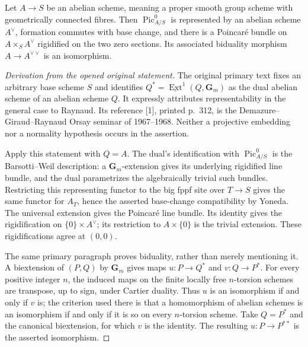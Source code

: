\begin{theorem}
\label{geo-Kb-dual}
Let $A\to S$ be an abelian scheme, meaning a proper smooth group scheme
with geometrically connected fibres. Then $\operatorname{Pic}^0_{A/S}$ is
represented by an abelian scheme $A^\vee$, formation commutes with base
change, and there is a Poincar\'e bundle on $A\times_S A^\vee$ rigidified
on the two zero sections. Its associated biduality morphism
$A\to A^{\vee\vee}$ is an isomorphism.
\end{theorem}
\begin{proof}[Derivation from the opened original statement]
The original primary text \cite[Expos\'e VIII, 3.2, pp.~254--255]{geoSGA7I}
fixes an arbitrary base scheme $S$ and identifies
$Q^*=\underline{\operatorname{Ext}}^1(Q,\mathbf G_m)$ as the dual abelian
scheme of an abelian scheme $Q$. It expressly attributes representability
in the general case to Raynaud. Its reference [1], printed p.~312, is the
Demazure--Giraud--Raynaud Orsay seminar of 1967--1968. Neither a projective
embedding nor a normality hypothesis occurs in the assertion.

Apply this statement with $Q=A$. The dual's identification with
$\operatorname{Pic}^0_{A/S}$ is the Barsotti--Weil description: a
$\mathbf G_m$-extension gives its underlying rigidified line bundle, and
the dual parametrizes the algebraically trivial such bundles. Restricting
this representing functor to the big fppf site over $T\to S$ gives the
same functor for $A_T$, hence the asserted base-change compatibility by
Yoneda. The universal extension gives the Poincar\'e line bundle. Its
identity gives the rigidification on $\{0\}\times A^\vee$; its restriction
to $A\times\{0\}$ is the trivial extension. These rigidifications agree
at $(0,0)$.

The same primary paragraph proves biduality, rather than merely mentioning
it. A biextension of $(P,Q)$ by $\mathbf G_m$ gives maps
$u:P\to Q^*$ and $v:Q\to P^*$. For every positive integer $n$, the
induced maps on the finite locally free $n$-torsion schemes are transpose,
up to sign, under Cartier duality. Thus $u$ is an isomorphism if and only
if $v$ is; the criterion used there is that a homomorphism of abelian
schemes is an isomorphism if and only if it is so on every $n$-torsion
scheme. Take $Q=P^*$ and the canonical biextension, for which $v$ is the
identity. The resulting $u:P\to P^{**}$ is the asserted isomorphism.


\end{proof}
